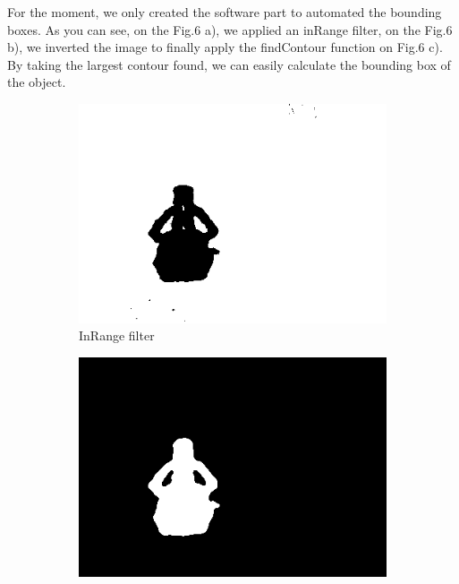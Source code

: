 \documentclass[runningheads,a4paper]{llncs}
\begin{document}
For the moment, we only created the software part to automated the bounding boxes. As you can see, on the Fig.6 a), we applied an inRange filter, on the Fig.6 b), we inverted the image to finally apply the findContour function on Fig.6 c). By taking the largest contour found, we can easily calculate the bounding box of the object.  \\
 
\begin{figure}[h!]
  \centering
  \begin{subfigure}[b]{0.3\linewidth}
    \includegraphics[width=\linewidth]{images/bounding_inrange.png}
    \caption{InRange filter}
  \end{subfigure}
  \begin{subfigure}[b]{0.3\linewidth}
    \includegraphics[width=\linewidth]{images/bounding_invert.png}

\end{subfigure}
\end{figure}
\end{document}
